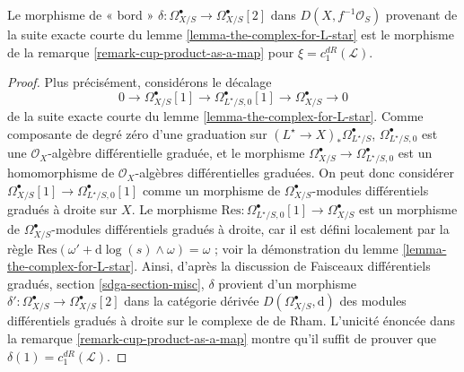 \begin{lemma}
\label{lemma-the-complex-for-L-star-gives-chern-class}
Le morphisme de « bord »
$\delta : \Omega^\bullet_{X/S} \to \Omega^\bullet_{X/S}[2]$
dans $D(X, f^{-1}\mathcal{O}_S)$ provenant de
la suite exacte courte du lemme \ref{lemma-the-complex-for-L-star}
est le morphisme de la remarque \ref{remark-cup-product-as-a-map}
pour $\xi = c_1^{dR}(\mathcal{L})$.
\end{lemma}

\begin{proof}
Plus précisément, considérons le décalage
$$
0 \to \Omega^\bullet_{X/S}[1] \to
\Omega^\bullet_{L^\star/S, 0}[1] \to
\Omega^\bullet_{X/S} \to 0
$$
de la suite exacte courte du lemme \ref{lemma-the-complex-for-L-star}.
Comme composante de degré zéro d'une graduation sur
$(L^\star \to X)_*\Omega^\bullet_{L^\star/S}$,
$\Omega^\bullet_{L^\star/S, 0}$ est une
$\mathcal{O}_X$-algèbre différentielle graduée, et le morphisme
$\Omega^\bullet_{X/S} \to \Omega^\bullet_{L^\star/S, 0}$
est un homomorphisme de $\mathcal{O}_X$-algèbres différentielles graduées.
On peut donc considérer $\Omega^\bullet_{X/S}[1] \to
\Omega^\bullet_{L^\star/S, 0}[1]$ comme un morphisme de
$\Omega^\bullet_{X/S}$-modules différentiels gradués à droite sur $X$. Le morphisme
$\text{Res} : \Omega^\bullet_{L^\star/S, 0}[1] \to \Omega^\bullet_{X/S}$
est un morphisme de $\Omega^\bullet_{X/S}$-modules différentiels gradués à droite,
car il est défini localement par la règle
$\text{Res}(\omega' + \text{d}\log(s) \wedge \omega) = \omega$ ; voir
la démonstration du lemme \ref{lemma-the-complex-for-L-star}.
Ainsi, d'après la discussion de
Faisceaux différentiels gradués, section \ref{sdga-section-misc},
$\delta$ provient d'un morphisme
$\delta' : \Omega^\bullet_{X/S} \to \Omega^\bullet_{X/S}[2]$
dans la catégorie dérivée $D(\Omega^\bullet_{X/S}, \text{d})$
des modules différentiels gradués à droite sur le complexe de de Rham.
L'unicité énoncée dans la remarque \ref{remark-cup-product-as-a-map}
montre qu'il suffit de prouver que $\delta(1) = c_1^{dR}(\mathcal{L})$.


\end{proof}
